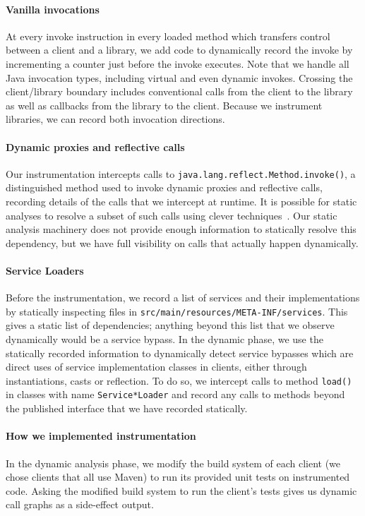 \paragraph{Vanilla invocations} 
At every invoke instruction in every
loaded method which transfers control between a client and a
library, we add code to dynamically record
the invoke by incrementing a counter just before the invoke
executes. Note that we handle all Java invocation types, including
virtual and even dynamic invokes. Crossing the client/library boundary
includes conventional calls from the client to the library as well as
callbacks from the library to the client.  Because we instrument
libraries, we can record both invocation directions.

\paragraph{Dynamic proxies and reflective calls}
Our instrumentation intercepts calls to
\texttt{java.lang.reflect.Method.invoke()}, a distinguished method
used to invoke dynamic proxies and reflective calls, 
recording details of the calls that we intercept at runtime. It is possible for
static analyses to resolve a subset of such calls using clever
techniques~\cite{christensen03:_precis_analy_strin_expres}. Our static analysis machinery does not provide enough information to
statically resolve this dependency, but we have full visibility on
calls that actually happen dynamically.

\paragraph{Service Loaders} Before the instrumentation, we record a list 
of services and their implementations by statically inspecting files in \texttt{src/main/resources/META-INF/services}. 
This gives a static list of dependencies; anything beyond this list that we observe dynamically would be a service bypass. 
In the dynamic phase, we use the statically recorded information to dynamically detect service bypasses which are direct uses of service implementation 
classes in clients, either through instantiations, casts or reflection. To do so, we intercept calls 
to method \texttt{load()} in classes with name \texttt{Service*Loader} and record any calls to methods beyond 
the published interface that we have recorded statically.

\paragraph{How we implemented instrumentation}
In the dynamic analysis phase, we modify the build system of each
client (we chose clients that all use Maven) to run its provided unit tests on instrumented code.
Asking the modified build system to run the client's tests gives us dynamic call graphs as a side-effect output.

